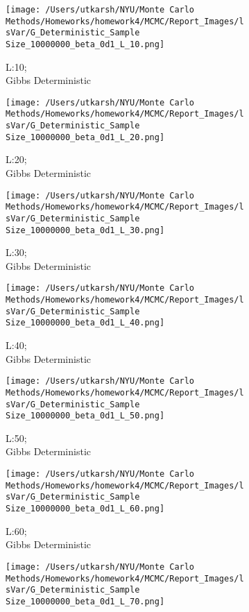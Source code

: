 \documentclass[11pt]{article}
\begin{document}
\begin{figure}[H]
	\centering
	\begin{subfigure}{.20\textwidth}
		\texttt{[image: /Users/utkarsh/NYU/Monte Carlo Methods/Homeworks/homework4/MCMC/Report\_Images/lsVar/G\_Deterministic\_Sample Size\_10000000\_beta\_0d1\_L\_10.png]}
		\caption{L:10;\\Gibbs Deterministic}
	\end{subfigure}
	\begin{subfigure}{.20\textwidth}
		\texttt{[image: /Users/utkarsh/NYU/Monte Carlo Methods/Homeworks/homework4/MCMC/Report\_Images/lsVar/G\_Deterministic\_Sample Size\_10000000\_beta\_0d1\_L\_20.png]}
		\caption{L:20;\\Gibbs Deterministic}
	\end{subfigure}
	\begin{subfigure}{.20\textwidth}
		\texttt{[image: /Users/utkarsh/NYU/Monte Carlo Methods/Homeworks/homework4/MCMC/Report\_Images/lsVar/G\_Deterministic\_Sample Size\_10000000\_beta\_0d1\_L\_30.png]}
		\caption{L:30;\\Gibbs Deterministic}
	\end{subfigure}
	\begin{subfigure}{.20\textwidth}
		\texttt{[image: /Users/utkarsh/NYU/Monte Carlo Methods/Homeworks/homework4/MCMC/Report\_Images/lsVar/G\_Deterministic\_Sample Size\_10000000\_beta\_0d1\_L\_40.png]}
		\caption{L:40;\\Gibbs Deterministic}
	\end{subfigure}
	\begin{subfigure}{.20\textwidth}
		\texttt{[image: /Users/utkarsh/NYU/Monte Carlo Methods/Homeworks/homework4/MCMC/Report\_Images/lsVar/G\_Deterministic\_Sample Size\_10000000\_beta\_0d1\_L\_50.png]}
		\caption{L:50;\\Gibbs Deterministic}
	\end{subfigure}
	\begin{subfigure}{.20\textwidth}
		\texttt{[image: /Users/utkarsh/NYU/Monte Carlo Methods/Homeworks/homework4/MCMC/Report\_Images/lsVar/G\_Deterministic\_Sample Size\_10000000\_beta\_0d1\_L\_60.png]}
		\caption{L:60;\\Gibbs Deterministic}
	\end{subfigure}
	\begin{subfigure}{.20\textwidth}
		\texttt{[image: /Users/utkarsh/NYU/Monte Carlo Methods/Homeworks/homework4/MCMC/Report\_Images/lsVar/G\_Deterministic\_Sample Size\_10000000\_beta\_0d1\_L\_70.png]}

\end{subfigure}
\end{figure}
\end{document}
